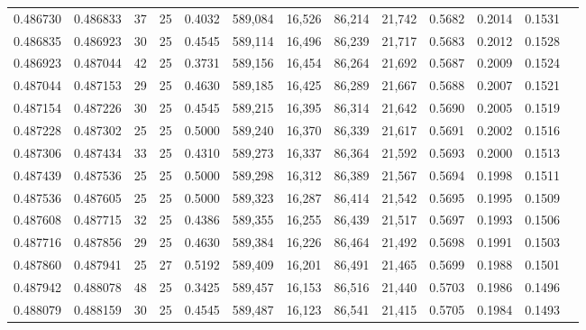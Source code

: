 \begin{tabular}{rrrrrrrrrrrrr}
0.486730 & 0.486833 &    37 &  25 &                                     0.4032 & 589,084 &  16,526 &  86,214 &  21,742 & 0.5682 & 0.2014 & 0.1531 \\
0.486835 & 0.486923 &    30 &  25 &                                     0.4545 & 589,114 &  16,496 &  86,239 &  21,717 & 0.5683 & 0.2012 & 0.1528 \\
0.486923 & 0.487044 &    42 &  25 &                                     0.3731 & 589,156 &  16,454 &  86,264 &  21,692 & 0.5687 & 0.2009 & 0.1524 \\
0.487044 & 0.487153 &    29 &  25 &                                     0.4630 & 589,185 &  16,425 &  86,289 &  21,667 & 0.5688 & 0.2007 & 0.1521 \\
0.487154 & 0.487226 &    30 &  25 &                                     0.4545 & 589,215 &  16,395 &  86,314 &  21,642 & 0.5690 & 0.2005 & 0.1519 \\
0.487228 & 0.487302 &    25 &  25 &                                     0.5000 & 589,240 &  16,370 &  86,339 &  21,617 & 0.5691 & 0.2002 & 0.1516 \\
0.487306 & 0.487434 &    33 &  25 &                                     0.4310 & 589,273 &  16,337 &  86,364 &  21,592 & 0.5693 & 0.2000 & 0.1513 \\
0.487439 & 0.487536 &    25 &  25 &                                     0.5000 & 589,298 &  16,312 &  86,389 &  21,567 & 0.5694 & 0.1998 & 0.1511 \\
0.487536 & 0.487605 &    25 &  25 &                                     0.5000 & 589,323 &  16,287 &  86,414 &  21,542 & 0.5695 & 0.1995 & 0.1509 \\
0.487608 & 0.487715 &    32 &  25 &                                     0.4386 & 589,355 &  16,255 &  86,439 &  21,517 & 0.5697 & 0.1993 & 0.1506 \\
0.487716 & 0.487856 &    29 &  25 &                                     0.4630 & 589,384 &  16,226 &  86,464 &  21,492 & 0.5698 & 0.1991 & 0.1503 \\
0.487860 & 0.487941 &    25 &  27 &                                     0.5192 & 589,409 &  16,201 &  86,491 &  21,465 & 0.5699 & 0.1988 & 0.1501 \\
0.487942 & 0.488078 &    48 &  25 &                                     0.3425 & 589,457 &  16,153 &  86,516 &  21,440 & 0.5703 & 0.1986 & 0.1496 \\
0.488079 & 0.488159 &    30 &  25 &                                     0.4545 & 589,487 &  16,123 &  86,541 &  21,415 & 0.5705 & 0.1984 & 0.1493 \\

\end{tabular}
